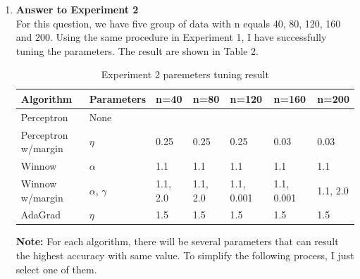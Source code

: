 \begin{enumerate}
{\bf Discussion:\\}

Comparing the Figure 1, 2, 3 and 4, we can find that as the number of examples increases, the number of mistakes will all increase for five algorithms. They will finally converge. However, their change trend is different. For Winnow and Winnow with Margin algorithm, they converge very fast. And AdaGrad algorithm converge a little slower than Winnow and Winnow with Margin algorithms. And Perception and Perception with Margin algorithms converge very slow. Of course, Perception with Margin behaves a little better than Perception algorithm. It makes less mistakes. From the point of making mistakes, Winnow, Winnow with Margin and AdaGrad have much better performance than Perception and Perception with Margin.\\


\item {\bf Answer to Experiment 2}\\

For this question, we have five group of data with n equals 40, 80, 120, 160 and 200. Using the same procedure in Experiment 1, I have successfully tuning the parameters. The result are shown in Table 2.\\

\begin{table}[H]
\caption {Experiment 2 paremeters tuning result} \label{tab:title} 
  \begin{center}
    \begin{tabular}{|p{3.0cm}|p{2.2cm}|p{1cm}|p{1cm}|p{1cm}|p{1cm}|p{1cm}|}
      \hline
      Algorithm & Parameters & n=40 & n=80 & n=120 & n=160 & n=200\\\hline\hline
      Perceptron & None &  &  & & &\\\hline
      Perceptron w/margin & $\eta$ & 0.25 & 0.25 & 0.25 & 0.03 & 0.03 \\\hline
      Winnow & $\alpha$& 1.1 & 1.1 & 1.1 & 1.1 & 1.1 \\\hline
      Winnow w/margin & $\alpha$, $\gamma$ & 1.1, 2.0 &  1.1, 2.0 & 1.1, 0.001 & 1.1, 0.001 & 1.1, 2.0 \\\hline
      AdaGrad & $\eta$ & 1.5 & 1.5 & 1.5 & 1.5 & 1.5 \\\hline
    \end{tabular}
  \end{center}
\end{table}

{\bf Note:} For each algorithm, there will be several parameters that can result the highest accuracy with same value. To simplify the following process, I just select one of them.\\


\end{enumerate}

